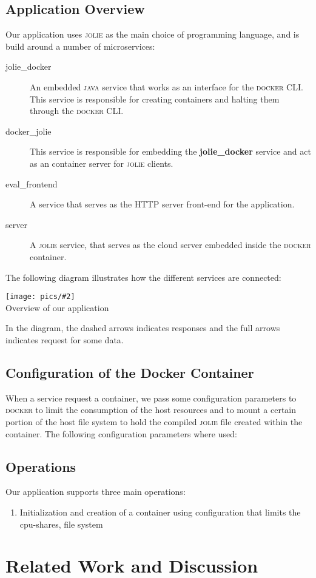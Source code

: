 \documentclass[12pt]{article}
\newcommand{\img}[3] {
	\begin{center}
	\texttt{[image: pics/\#2]}\\
	{\small #3}
	\end{center}
}
\newcommand{\docker}[0] {\textsc{docker}}
\newcommand{\jolie}[0] {\textsc{jolie}}
\newcommand{\java} {\textsc{java}}
\begin{document}
\subsection{Application Overview}
Our application uses \jolie{} as the main choice of programming language, and is build around a number of microservices:

\begin{description}
\item[jolie\_docker] An embedded \java{} service that works as an interface for the \docker{} CLI. This service is responsible for creating containers and halting them through the \docker{} CLI. 
\item[docker\_jolie] This service is responsible for embedding the \textbf{jolie\_docker} service and act as an container server for \jolie{} clients. 
\item[eval\_frontend] A service that serves as the HTTP server front-end for the application. 
\item[server] A \jolie{} service, that serves as the cloud server embedded inside the \docker{} container.
\end{description}
The following diagram illustrates how the different services are connected:
\img{0.6}{system}{Overview of our application}
In the diagram, the dashed arrows indicates responses and the full arrows indicates request for some data.

\subsection{Configuration of the Docker Container}

When a service request a container, we pass some configuration parameters to \docker{} to limit the consumption of the host resources and to mount a certain portion of the host file system to hold the compiled \jolie{} file created within the container. The following configuration parameters where used:

\subsection{Operations}
Our application supports three main operations:
\begin{enumerate}
\item Initialization and creation of a container using configuration that limits the cpu-shares, file system 
\end{enumerate}

\section{Related Work and Discussion}
\end{document}
